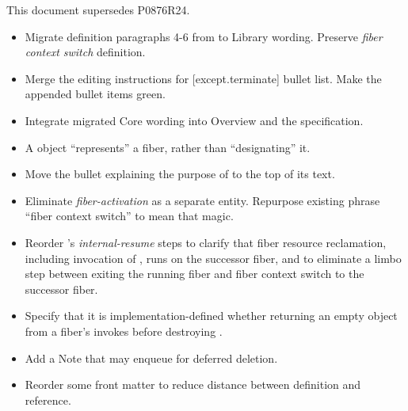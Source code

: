 \label{history}
This document supersedes P0876R24.


\begin{itemize}
    \item Migrate definition paragraphs 4-6 from  to
          Library wording. Preserve \emph{fiber context switch} definition.
    \item Merge the editing instructions for [except.terminate] bullet list.
          Make the appended bullet items green.
    \item Integrate migrated Core wording into \fiber Overview and
          the \resumewith specification.
    \item A \fiber object ``represents'' a fiber, rather than ``designating''
          it.
    \item Move the bullet explaining the purpose of \resumewith to the top of
          its text.
    \item Eliminate \emph{fiber-activation} as a separate entity. Repurpose
          existing phrase ``fiber context switch'' to mean that magic.
    \item Reorder \resumewith's \emph{internal-resume} steps to clarify that
          fiber resource reclamation, including invocation
          of , runs on the successor fiber, and to eliminate
          a limbo step between exiting the running fiber
          and fiber context switch to the successor fiber.
    \item Specify that it is implementation-defined whether returning an
          empty \fiber object from a fiber's \entryfn invokes \termn before
          destroying .
    \item Add a Note that  may enqueue for deferred deletion.
    \item Reorder some \resumewith front matter to reduce distance between
          definition and reference.
\end{itemize}


